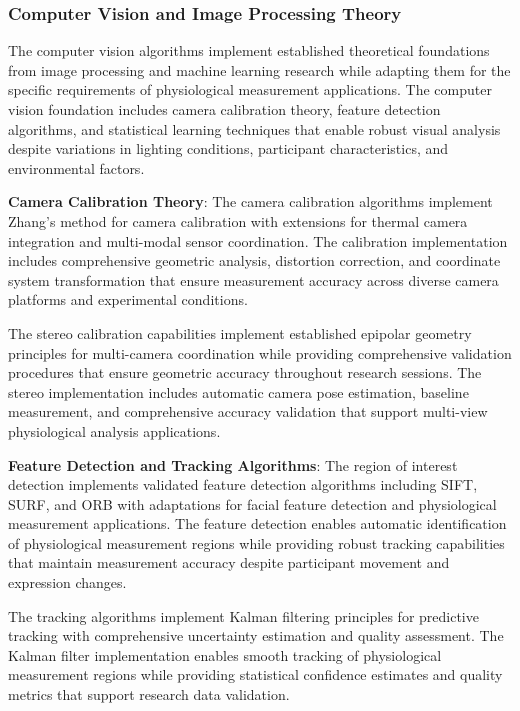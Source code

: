 \documentclass[12pt,a4paper]{report}
\begin{document}
\subsubsection{Computer Vision and Image Processing Theory}

The computer vision algorithms implement established theoretical foundations from image processing and machine learning
research while adapting them for the specific requirements of physiological measurement applications. The computer
vision foundation includes camera calibration theory, feature detection algorithms, and statistical learning techniques
that enable robust visual analysis despite variations in lighting conditions, participant characteristics, and
environmental factors.

\textbf{Camera Calibration Theory}: The camera calibration algorithms implement Zhang's method for camera calibration with
extensions for thermal camera integration and multi-modal sensor coordination. The calibration implementation includes
comprehensive geometric analysis, distortion correction, and coordinate system transformation that ensure measurement
accuracy across diverse camera platforms and experimental conditions.

The stereo calibration capabilities implement established epipolar geometry principles for multi-camera coordination
while providing comprehensive validation procedures that ensure geometric accuracy throughout research sessions. The
stereo implementation includes automatic camera pose estimation, baseline measurement, and comprehensive accuracy
validation that support multi-view physiological analysis applications.

\textbf{Feature Detection and Tracking Algorithms}: The region of interest detection implements validated feature detection
algorithms including SIFT, SURF, and ORB with adaptations for facial feature detection and physiological measurement
applications. The feature detection enables automatic identification of physiological measurement regions while
providing robust tracking capabilities that maintain measurement accuracy despite participant movement and expression
changes.

The tracking algorithms implement Kalman filtering principles for predictive tracking with comprehensive uncertainty
estimation and quality assessment. The Kalman filter implementation enables smooth tracking of physiological measurement
regions while providing statistical confidence estimates and quality metrics that support research data validation.
\end{document}
